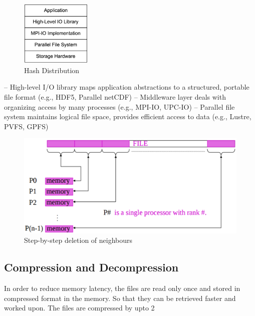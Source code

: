 \documentclass[article,dr=phil,type=drfinal,colorback,accentcolor=tud9c]{tudthesis}
\begin{document}
\begin{figure}[htb]
	\centering
	\includegraphics[width=0.3\textwidth]{images/paralleliostack}
	\caption[Hash Distribution]{Hash Distribution}
	\label{fig:paralleliostack}
\end{figure}

    – High-level I/O library maps application abstractions to a structured, portable file format (e.g., HDF5, Parallel netCDF)
– Middleware layer deals with organizing access by many processes (e.g., MPI-IO, UPC-IO) – Parallel file system maintains logical file space, provides efficient access to data (e.g., Lustre, PVFS, GPFS)    
    
    


\begin{figure}[htb]
	\centering
	\includegraphics[width=150mm]{images/fileprocessing}
	\caption[Step-by-step deletion of neighbours]{Step-by-step deletion of neighbours}
	\label{fig:fileprocessing}
\end{figure}


\newpage
\subsection{Compression and Decompression}
In order to reduce memory latency, the files are read only once and stored in compressed format in the memory. So that they can be retrieved faster and worked upon. The files are compressed by upto 2%

\newpage
\end{document}
